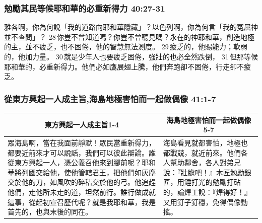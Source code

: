 \subsubsection{勉勵其民等候耶和華的必重新得力 40:27-31}
雅各啊，你為何說「我的道路向耶和華隱藏」？以色列啊，你為何言「我的冤屈神並不查問」？ 28 你豈不曾知道嗎？你豈不曾聽見嗎？永在的神耶和華，創造地極的主，並不疲乏，也不困倦，他的智慧無法測度。 29 疲乏的，他賜能力；軟弱的，他加力量。 30 就是少年人也要疲乏困倦，強壯的也必全然跌倒， 31 但那等候耶和華的，必重新得力。他們必如鷹展翅上騰，他們奔跑卻不困倦，行走卻不疲乏。

\subsubsection{從東方興起一人成主旨,海島地極害怕而一起做偶像 41:1-7}
\begin{table}[H]
\centering
\begin{tabular}{p{11.25cm}|p{6.0cm}}\hline\hline
\multicolumn{1}{c|}{東方興起一人成主旨1-4}&\multicolumn{1}{c}{海島地極害怕而一起做偶像5-7}\\\hline
眾海島啊，當在我面前靜默！眾民當重新得力，都要近前來才可以說話，我們可以彼此辯論。誰從東方興起一人，憑公義召他來到腳前呢？耶和華將列國交給他，使他管轄君王，把他們如灰塵交於他的刀，如風吹的碎秸交於他的弓。他追趕他們，走他所未走的道，坦然前行。誰行做成就這事，從起初宣召歷代呢？就是我耶和華，我是首先的，也與末後的同在。
&海島看見就都害怕，地極也都戰兢，就近前來。他們各人幫助鄰舍，各人對弟兄說：『壯膽吧！』木匠勉勵銀匠，用錘打光的勉勵打砧的，論焊工說：『焊得好！』又用釘子釘穩，免得偶像動搖。\\\hline
\end{tabular}
\end{table}
 


